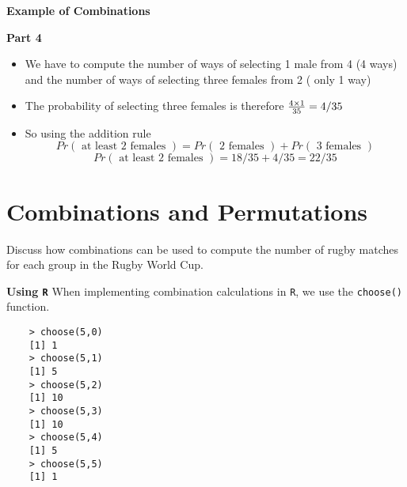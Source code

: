 \documentclass[]{report}
\begin{document}
	{
		\textbf{Example of Combinations}
		
		\textbf{Part 4}
		\begin{itemize}
			\item We have to compute the number of ways of selecting 1 male from 4 (4 ways) and the number of ways of selecting three females from 2 ( only 1 way)
			\item The probability of selecting three females is therefore ${4 \times 1 \over 35} = 4/35$
			\item So using the addition rule
			\[ Pr(\mbox{ at least 2 females }) = Pr(\mbox{ 2 females }) + Pr(\mbox{ 3 females }) \]
			\[ Pr(\mbox{ at least 2 females })  = 18/35 + 4/35 = 22/35 \]
		\end{itemize}
		
	}
	
	
	
	
	\section{ Combinations and Permutations }
	
	

	
	Discuss how combinations can be used to compute the number of rugby matches for each group in the Rugby World Cup.
	
	

	
	
	\textbf{Using \texttt{R}}
	When implementing combination calculations in \texttt{R}, we use the \texttt{choose()} function.
	
	\begin{verbatim}
	> choose(5,0)
	[1] 1
	> choose(5,1)
	[1] 5
	> choose(5,2)
	[1] 10
	> choose(5,3)
	[1] 10
	> choose(5,4)
	[1] 5
	> choose(5,5)
	[1] 1
	\end{verbatim}
	
\end{document}
